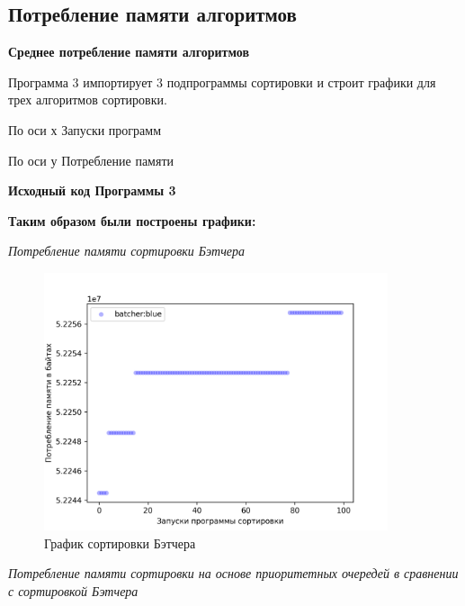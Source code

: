 \subsection{Потребление памяти алгоритмов}



\begin{center}
    \textbf{Среднее потребление памяти алгоритмов}
\end{center}



Программа 3 импортирует 3 подпрограммы сортировки и строит графики для трех алгоритмов сортировки.

По оси х Запуски программ

По оси у Потребление памяти

\textbf{Исходный код Программы 3}




\textbf{Таким образом были построены графики:}

\textit{Потребление памяти сортировки Бэтчера}

\begin{figure}[H]
    \centering
    \includegraphics[width=0.9\textwidth]{./plots/batcher_memory.png}
    \caption{График сортировки Бэтчера}
\end{figure}


\textit{Потребление памяти сортировки на основе приоритетных очередей в сравнении с сортировкой Бэтчера}

